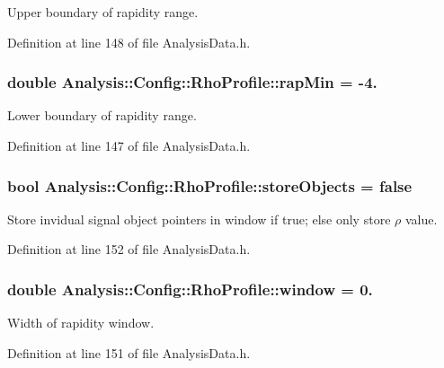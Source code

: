 Upper boundary of rapidity range. 



Definition at line 148 of file Analysis\+Data.\+h.

\subsubsection[{\texorpdfstring{rap\+Min}{rapMin}}]{\setlength{\rightskip}{0pt plus 5cm}double Analysis\+::\+Config\+::\+Rho\+Profile\+::rap\+Min = -\/4.\hspace{0.3cm}{\ttfamily [static]}}\hypertarget{namespaceAnalysis_1_1Config_1_1RhoProfile_a75f726356d3f7bb7894942b568f83123}{}\label{namespaceAnalysis_1_1Config_1_1RhoProfile_a75f726356d3f7bb7894942b568f83123}


Lower boundary of rapidity range. 



Definition at line 147 of file Analysis\+Data.\+h.

\subsubsection[{\texorpdfstring{store\+Objects}{storeObjects}}]{\setlength{\rightskip}{0pt plus 5cm}bool Analysis\+::\+Config\+::\+Rho\+Profile\+::store\+Objects = false\hspace{0.3cm}{\ttfamily [static]}}\hypertarget{namespaceAnalysis_1_1Config_1_1RhoProfile_af8222f6942cc30594db578bb98a39b3b}{}\label{namespaceAnalysis_1_1Config_1_1RhoProfile_af8222f6942cc30594db578bb98a39b3b}


Store invidual signal object pointers in window if {\ttfamily true}; else only store $ \rho $ value. 



Definition at line 152 of file Analysis\+Data.\+h.

\subsubsection[{\texorpdfstring{window}{window}}]{\setlength{\rightskip}{0pt plus 5cm}double Analysis\+::\+Config\+::\+Rho\+Profile\+::window = 0.\hspace{0.3cm}{\ttfamily [static]}}\hypertarget{namespaceAnalysis_1_1Config_1_1RhoProfile_a0d0b2059ea054c907e9ef66dd1bc3604}{}\label{namespaceAnalysis_1_1Config_1_1RhoProfile_a0d0b2059ea054c907e9ef66dd1bc3604}


Width of rapidity window. 



Definition at line 151 of file Analysis\+Data.\+h.

